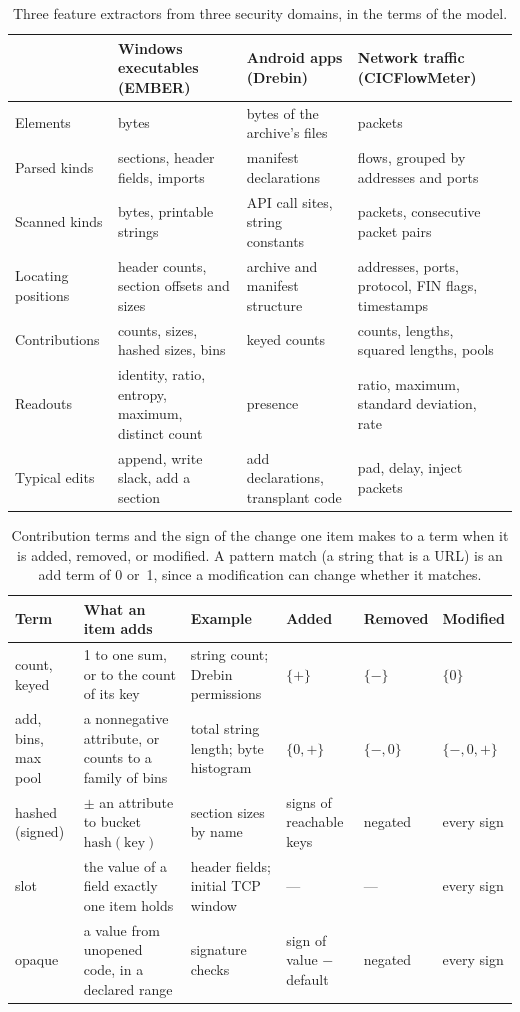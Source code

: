 \begin{table}[t]
  \caption{Three feature extractors from three security domains, in the terms of the model.}
  \label{tab:fw:domains}
  \small
  \begin{tabular}{@{}p{}p{}p{}p{}@{}}
    \toprule
    & Windows executables (EMBER) & Android apps (Drebin) & Network traffic (CICFlowMeter) \\
    \midrule
    Elements & bytes & bytes of the archive's files & packets \\
    Parsed kinds & sections, header fields, imports & manifest declarations & flows, grouped by addresses and ports \\
    Scanned kinds & bytes, printable strings & API call sites, string constants & packets, consecutive packet pairs \\
    Locating positions & header counts, section offsets and sizes & archive and manifest structure & addresses, ports, protocol, FIN flags, timestamps \\
    Contributions & counts, sizes, hashed sizes, bins & keyed counts & counts, lengths, squared lengths, pools \\
    Readouts & identity, ratio, entropy, maximum, distinct count & presence & ratio, maximum, standard deviation, rate \\
    Typical edits & append, write slack, add a section & add declarations, transplant code & pad, delay, inject packets \\
    \bottomrule
  \end{tabular}
\end{table}

\begin{table}[t]
  \caption{Contribution terms and the sign of the change one item makes to a term when it is added, removed, or
  modified. A pattern match (a string that is a URL) is an add term of 0 or~1, since a modification can change
  whether it matches.}
  \label{tab:fw:terms}
  \small
  \begin{tabular}{@{}lp{}p{}lll@{}}
    \toprule
    Term & What an item adds & Example & Added & Removed & Modified \\
    \midrule
    count, keyed & 1 to one sum, or to the count of its key & string count; Drebin permissions & $\{+\}$ & $\{-\}$ & $\{0\}$ \\
    add, bins, max pool & a nonnegative attribute, or counts to a family of bins & total string length; byte histogram & $\{0,+\}$ & $\{-,0\}$ & $\{-,0,+\}$ \\
    hashed (signed) & $\pm$ an attribute to bucket $\mathrm{hash}(\text{key})$ & section sizes by name & signs of reachable keys & negated & every sign \\
    slot & the value of a field exactly one item holds & header fields; initial TCP window & --- & --- & every sign \\
    opaque & a value from unopened code, in a declared range & signature checks & sign of value $-$ default & negated & every sign \\
    \bottomrule
  \end{tabular}
\end{table}

